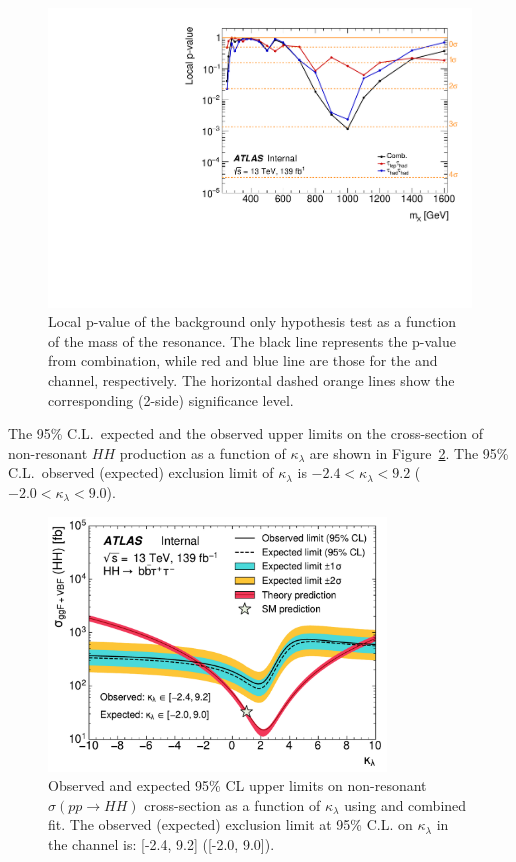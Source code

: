 \begin{figure}
\centering
\includegraphics[width=.8\textwidth]{figures/results/HH/Combined/CombObsPvalues_21072021.pdf}
\caption{Local p-value of the background only hypothesis test as a function of the mass of the resonance. 
The black line represents the p-value from combination, while red and blue line are those 
for the \lephad and \hadhad channel, respectively. 
The horizontal dashed orange lines show the corresponding (2-side) significance level.}
\label{fig:CombinedPValues}
\end{figure}

The 95\% C.L.\ expected and the observed upper limits on the cross-section of non-resonant $HH$ production 
as a function of $\kappa_\lambda$ are shown in Figure~\ref{fig:kl_scan_individual_channels}.
The 95\% C.L.\ observed (expected) exclusion limit of $\kappa_\lambda$ is $-2.4 < \kappa_\lambda < 9.2$ 
($-2.0< \kappa_\lambda < 9.0$).

\begin{figure}[htbp]
\centering
\includegraphics[width=0.8\textwidth]{DiHiggs/plots/kl_scan/20210926/bbtautau_kl_scan_mH125.pdf}
\caption{Observed and expected 95\% CL upper limits on non-resonant $\sigma(pp \rightarrow HH)$ 
    cross-section  as a function of $\kappa_\lambda$ using \lephad and \hadhad combined fit.
    The observed (expected) exclusion limit at 95\% C.L. on $\kappa_\lambda$ in the \bbtautau channel is: 
    [-2.4, 9.2] ([-2.0, 9.0]). 
}
\label{fig:kl_scan_individual_channels}
\end{figure}



